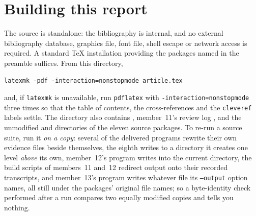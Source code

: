 \documentclass[11pt,letterpaper]{article}
\numberwithin{equation}{section}
\theoremstyle{definition}
\theoremstyle{remark}
\begin{document}
\section{Building this report}
\label{diff:app:build}

The source  is standalone: the bibliography is internal, and
no external bibliography database, graphics file, font file, shell escape or
network access is required. A standard TeX installation providing the packages
named in the preamble suffices. From this directory,
\begin{verbatim}
latexmk -pdf -interaction=nonstopmode article.tex
\end{verbatim}
and, if \texttt{latexmk} is unavailable, run \texttt{pdflatex} with
\texttt{-interaction=nonstopmode} three times so that the table of contents,
the cross-references and the \texttt{cleveref} labels settle. The directory
also contains , member~11's review log
, and the unmodified  and
 directories of the eleven source packages. To re-run a source
suite, run it \emph{on a copy}: several of the delivered programs rewrite their own evidence files beside themselves, the
eighth writes to a  directory it creates one level \emph{above} its
own, member~12's program writes  into the current
directory, the build scripts of members~11 and~12 redirect output onto their
recorded transcripts, and member~13's program writes whatever file its
\texttt{--output} option names, all still under the packages' original file
names; so a
byte-identity check performed after a run compares two equally modified copies
and tells you nothing.
\end{document}
